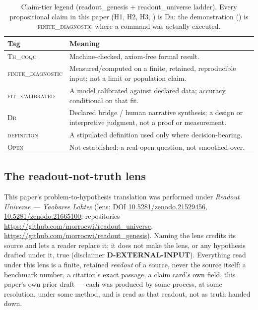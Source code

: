 \documentclass[10pt,twocolumn]{article}
\newcommand{\ThCoqc}{\textsc{Th\_coqc}}
\newcommand{\FiniteDiag}{\textsc{finite\_diagnostic}}
\newcommand{\FitCal}{\textsc{fit\_calibrated}}
\newcommand{\DrTier}{\textsc{Dr}}
\newcommand{\DefTier}{\textsc{definition}}
\newcommand{\OpenTier}{\textsc{Open}}
\begin{document}
\begin{table}[t]
\centering
\scriptsize
\begin{tabularx}{\linewidth}{@{}l X@{}}
\toprule
\textbf{Tag} & \textbf{Meaning} \\
\midrule
\ThCoqc{} & Machine-checked, axiom-free formal result. \\
\FiniteDiag{} & Measured/computed on a finite, retained, reproducible input; not a limit or population claim. \\
\FitCal{} & A model calibrated against declared data; accuracy conditional on that fit. \\
\DrTier{} & Declared bridge / human narrative synthesis; a design or interpretive judgment, not a proof or measurement. \\
\DefTier{} & A stipulated definition used only where decision-bearing. \\
\OpenTier{} & Not established; a real open question, not smoothed over. \\
\bottomrule
\end{tabularx}
\caption{Claim-tier legend (readout\_genesis + readout\_universe ladder). Every propositional claim
in this paper (H1, H2, H3, ) is \DrTier{}; the demonstration
() is \FiniteDiag{} where a command was actually executed.}
\label{tab:tiers}
\end{table}

\subsection{The readout-not-truth lens}
This paper's problem-to-hypothesis translation was performed under \emph{Readout Universe ---
Yaoharee Lahtee} (lens; DOI \href{https://doi.org/10.5281/zenodo.21529456}{10.5281/zenodo.21529456},
\href{https://doi.org/10.5281/zenodo.21665100}{10.5281/zenodo.21665100}; repositories
\url{https://github.com/morrocwi/readout_universe},
\url{https://github.com/morrocwi/readout_genesis}). Naming the lens credits its source and lets a
reader replace it; it does not make the lens, or any hypothesis drafted under it, true
(disclaimer \textbf{D-EXTERNAL-INPUT}). Everything read under this lens is a finite, retained
\emph{readout} of a source, never the source itself: a benchmark number, a citation's exact
passage, a claim card's own field, this paper's own prior draft --- each was produced by some
process, at some resolution, under some method, and is read as that readout, not as truth handed
down.
\end{document}
